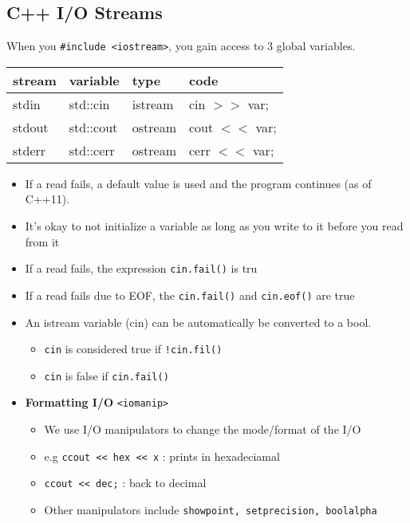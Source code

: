 \documentclass[12pt]{article}
\begin{document}
\subsection{C++ I/O Streams}
When you \lstinline{#include <iostream>}, you gain access to 3 global variables.\\
\begin{tabular}{l|l|l|l}
     stream & variable & type & code \\ \hline
     stdin & std::cin & istream & cin $>>$ var; \\ \hline 
     stdout & std::cout & ostream & cout $<<$ var; \\ \hline
     stderr & std::cerr & ostream & cerr $<<$ var; \\
\end{tabular}
\begin{itemize}
    \item If a read fails, a default value is used and the program continues (as of C++11). 
    \item It's okay to not initialize a variable as long as you write to it before you read from it
    \item If a read fails, the expression \lstinline{cin.fail()} is tru
    \item If a read fails due to EOF, the \lstinline{cin.fail()} and \lstinline{cin.eof()} are true
    \item An istream variable (cin) can be automatically be converted to a bool.
    \begin{itemize}
        \item \lstinline{cin} is considered true if \lstinline{!cin.fil()}
        \item \lstinline{cin} is false if \lstinline{cin.fail()}
    \end{itemize}
    \item \textbf{Formatting I/O} \lstinline{<iomanip>}
    \begin{itemize}
        \item We use I/O manipulators to change the mode/format of the I/O
        \item e.g \lstinline{ccout << hex << x} : prints in hexadeciamal
        \item \lstinline{ccout << dec;} : back to decimal
        \item Other manipulators include \lstinline{showpoint, setprecision, boolalpha}
    \end{itemize}
\end{itemize}
\end{document}
